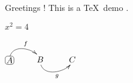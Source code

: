 \documentclass[10pt,a4paper]{article}
\begin{document}
Greetings ! This is a \TeX\ demo .

$x^2=4$

$\xymatrix{
*+<3pt>[F-:<3pt>]{A} \ar@`{[]+/u+2pc/,[r]+/u+1pc/}[r]^{f} & 
B \ar@`{[]+/d+2pc/,[r]+/d+1pc/}[r]_{g} & 
C
}$
    
\end{document}
